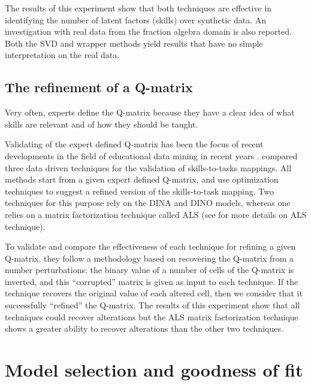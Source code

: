 The results of this experiment show that both techniques are effective in identifying the number of latent factors (skills) over synthetic data. An investigation with real data from the fraction algebra domain is also reported. Both the SVD and wrapper methods yield results that have no simple interpretation on the real data. 


\subsection{The refinement of a Q-matrix}
\label{edm2014}

Very often, experts define the Q-matrix because they have a clear idea of what skills are relevant and of how they should be taught.

Validating of the expert defined Q-matrix has been the focus of recent developments in the field of educational data mining in recent years \citep{delaTorre2008,chiu2013statistical,barnes2010novel,loye2011validite,Desmarais2013aied}. \citet{desmarais2014refinement} compared three data driven techniques for the validation of skills-to-tasks mappings.  All methods start from a given expert defined Q-matrix, and use optimization techniques to suggest a refined version of the skills-to-task mapping. Two techniques for this purpose rely on the DINA and DINO models, whereas one relies on a matrix factorization technique called ALS (see \citep{Desmarais2013aied} for more details on ALS technique). 

To validate and compare the effectiveness of each technique for refining a given Q-matrix, they follow a methodology based on recovering the Q-matrix from a number perturbations: the binary value of a number of cells of the Q-matrix is inverted, and this ``corrupted'' matrix is given as input to each technique.  If the technique recovers the original value of each altered cell, then we consider that it successfully ``refined'' the Q-matrix. The results of this experiment show that all techniques could recover alterations but the ALS matrix factorization technique shows a greater ability to recover alterations than the other two techniques.



\section{Model selection and goodness of fit}

